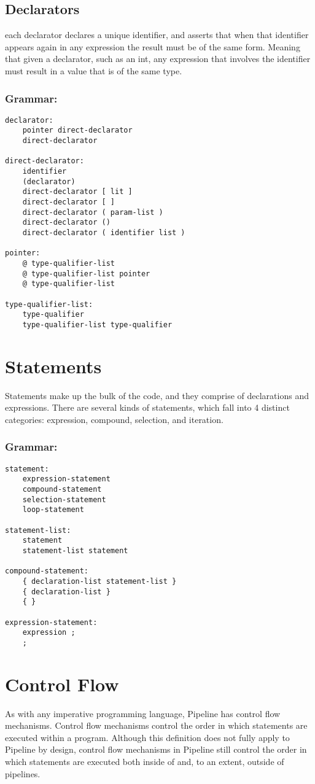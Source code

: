 \documentclass[./LRM_main.tex]{subfiles}
\begin{document}
\subsection{Declarators}
each declarator declares a unique identifier, and asserts that when that identifier appears again in any expression the result must be of the same form. Meaning that given a declarator, such as an int, any expression that involves the identifier must result in a value that is of the same type.
\subsubsection{Grammar:}
\begin{lstlisting}
declarator:
	pointer direct-declarator
	direct-declarator

direct-declarator:
	identifier
	(declarator)
	direct-declarator [ lit ]
	direct-declarator [ ]
	direct-declarator ( param-list )
	direct-declarator ()
	direct-declarator ( identifier list )

pointer:
	@ type-qualifier-list
	@ type-qualifier-list pointer
	@ type-qualifier-list

type-qualifier-list:
	type-qualifier
	type-qualifier-list type-qualifier
\end{lstlisting}
\section{Statements}
Statements make up the bulk of the code, and they comprise of declarations and expressions. There are several kinds of statements, which fall into 4 distinct categories: expression, compound, selection, and iteration.
\subsubsection{Grammar:}
\begin{lstlisting}
statement:
	expression-statement
	compound-statement
	selection-statement
	loop-statement

statement-list:
	statement
	statement-list statement

compound-statement:
	{ declaration-list statement-list }
	{ declaration-list }
	{ }

expression-statement:
	expression ;
	;

\end{lstlisting}
\section{Control Flow}
As with any imperative programming language, Pipeline has control flow mechanisms. Control flow mechanisms control the order in which statements are executed within a program. Although this definition does not fully apply to Pipeline by design, control flow mechanisms in Pipeline still control the order in which statements are executed both inside of and, to an extent, outside of pipelines.
\end{document}
